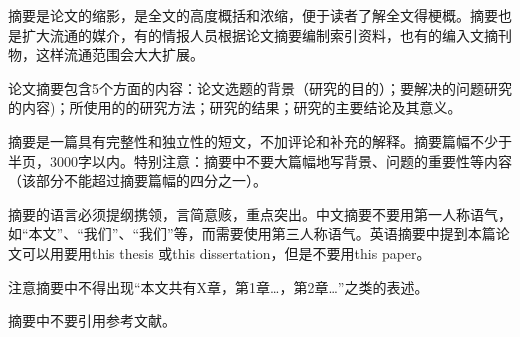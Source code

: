 
摘要是论文的缩影，是全文的高度概括和浓缩，便于读者了解全文得梗概。摘要也是扩大流通的媒介，有的情报人员根据论文摘要编制索引资料，也有的编入文摘刊物，这样流通范围会大大扩展。

论文摘要包含5个方面的内容：论文选题的背景（研究的目的）；要解决的问题研究的内容)；所使用的的研究方法；研究的结果；研究的主要结论及其意义。

摘要是一篇具有完整性和独立性的短文，不加评论和补充的解释。摘要篇幅不少于半页，3000字以内。特别注意：摘要中不要大篇幅地写背景、问题的重要性等内容（该部分不能超过摘要篇幅的四分之一）。

摘要的语言必须提纲携领，言简意赅，重点突出。中文摘要不要用第一人称语气，如“本文”、“我们”、“我们”等，而需要使用第三人称语气。英语摘要中提到本篇论文可以用要用this thesis 或this dissertation，但是不要用this paper。

注意摘要中不得出现“本文共有X章，第1章…，第2章…”之类的表述。

摘要中不要引用参考文献。
